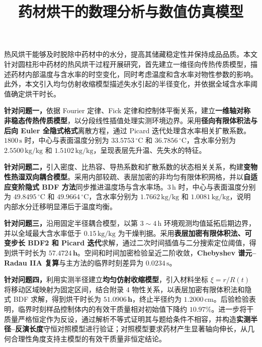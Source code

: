 \documentclass[withoutpreface,bwprint]{cumcmthesis}
\title{药材烘干的数理分析与数值仿真模型}
\makeatletter
\renewenvironment{abstract}{%
\if@twocolumn
    \section*{\abstractname}%
  \else
   \begin{center}%
  {\zihao{4}\bfseries \abstractname\vspace{-.5em}\vspace{\z@}}%
   \end{center}%
   \quotation
  \fi}
  {\if@twocolumn\else\endquotation\clearpage\fi}
\makeatother
\begin{document}
\maketitle

\begin{abstract}
热风烘干能够及时脱除中药材中的水分，提高其储藏稳定性并保持成品品质。本文针对圆柱形中药材的热风烘干过程开展研究，首先建立一维径向传热传质模型，描述药材内部温度与含水率的时空变化，同时考虑温度和含水率对物性参数的影响。此外，本文引入均匀仿射收缩模型描述失水引起的半径变化，并依据全域含水率阈值确定烘干时长。

\textbf{针对问题一，}依据 Fourier 定律、Fick 定律和控制体平衡关系，建立\textbf{一维轴对称非稳态传热传质模型}，以分段线性插值处理实测环境边界。采用\textbf{径向有限体积法与后向 Euler 全隐式格式}离散方程，通过 Picard 迭代处理含水率相关扩散系数。$1800\,\mathrm{s}$ 时，中心与表面温度分别为 $33.5753\,{}^\circ\mathrm{C}$ 和 $36.7856\,{}^\circ\mathrm{C}$，含水率分别为 $2.5500\,\mathrm{kg/kg}$ 和 $1.5102\,\mathrm{kg/kg}$，呈现表层先升温、先失水的特征。

\textbf{针对问题二，}引入密度、比热容、导热系数和扩散系数的状态相关关系，构建\textbf{变物性热湿双向耦合模型}。采用内部较疏、表层加密的非均匀有限体积网格，并以\textbf{自适应变阶隐式 BDF 方法}同步推进温度场与含水率场。$3\,\mathrm{h}$ 时，中心与表面温度分别为 $49.8495\,{}^\circ\mathrm{C}$ 和 $49.9664\,{}^\circ\mathrm{C}$，含水率分别为 $1.7662\,\mathrm{kg/kg}$ 和 $1.0081\,\mathrm{kg/kg}$，说明内部水分迁移明显滞后于温度均衡。

\textbf{针对问题三，}沿用固定半径耦合模型，以第 $3\sim4\,\mathrm{h}$ 环境观测均值延拓后期边界，并以全域最大含水率低于 $0.15\,\mathrm{kg/kg}$ 为干燥判据。采用\textbf{表层加密有限体积法、可变步长 BDF2 和 Picard 迭代}求解，通过二次时间插值与二分搜索定位阈值，得到烘干时长为 $\mathbf{57.4724\,h}$。空间和时间加密检验呈近二阶收敛，\textbf{Chebyshev 谱元--Radau IIA 复算}与主方法的临界时刻差异为 $0.0234\,\mathrm{s}$。

\textbf{针对问题四，}利用实测半径建立\textbf{均匀仿射收缩模型}，引入材料坐标 $\xi=r/R(t)$ 将移动区域映射为固定区间，结合附录 4 物性关系，以表层加密有限体积法和隐式 BDF 求解，得到烘干时长为 $\mathbf{51.0906\,h}$，终止半径约为 $1.2000\,\mathrm{cm}$。后验检验表明，临界时刻样品控制体内的有效干质量相对初始值下降约 $10.97\%$。进一步将干质量严格恒定作为反设，通过解析不等式证明其与题给条件不相容，并构造\textbf{实测半径--反演长度}守恒对照模型进行验证；对照模型要求药材产生显著轴向伸长，从几何合理性角度支持主模型的有效干质量非恒定结论。

\end{abstract}
\end{document}
